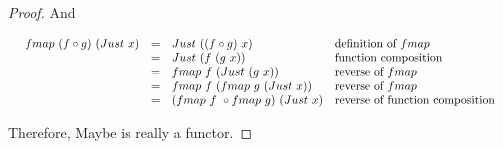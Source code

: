\documentclass{article}
\begin{document}
\begin{example}
\begin{mdframed}
\begin{proof}
And

\[
\resizebox{\textwidth}{!}{\ensuremath{
\begin{array}{rcll}
fmap\ (f \circ g)\ (Just\ x) & = & Just\ ((f \circ g)\ x) & \text{definition of $fmap$} \\
           & = & Just\ (f\ (g\ x)) & \text{function composition} \\
           & = & fmap\ f\ (Just\ (g\ x)) & \text{reverse of $fmap$} \\
           & = & fmap\ f\ (fmap\ g\ (Just\ x)) & \text{reverse of $fmap$} \\
           & = & (fmap\ f\ \circ fmap\ g)\ (Just\ x) & \text{reverse of function composition}
\end{array}
}}
\]

Therefore, Maybe is really a functor.
\end{proof}
\end{mdframed}
\end{example}
\end{document}
